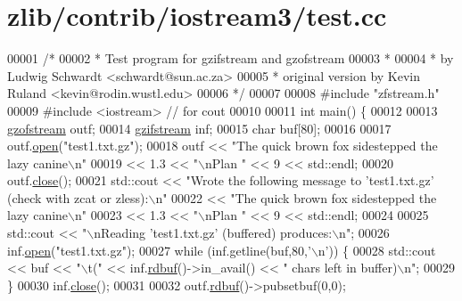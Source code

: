 \hypertarget{zlib_2contrib_2iostream3_2test_8cc_source}{}\section{zlib/contrib/iostream3/test.cc}
\label{zlib_2contrib_2iostream3_2test_8cc_source}

\begin{DoxyCode}
00001 \textcolor{comment}{/*}
00002 \textcolor{comment}{ * Test program for gzifstream and gzofstream}
00003 \textcolor{comment}{ *}
00004 \textcolor{comment}{ * by Ludwig Schwardt <schwardt@sun.ac.za>}
00005 \textcolor{comment}{ * original version by Kevin Ruland <kevin@rodin.wustl.edu>}
00006 \textcolor{comment}{ */}
00007 
00008 \textcolor{preprocessor}{#include "zfstream.h"}
00009 \textcolor{preprocessor}{#include <iostream>}      \textcolor{comment}{// for cout}
00010 
00011 \textcolor{keywordtype}{int} main() \{
00012 
00013   \hyperlink{classgzofstream}{gzofstream} outf;
00014   \hyperlink{classgzifstream}{gzifstream} inf;
00015   \textcolor{keywordtype}{char} buf[80];
00016 
00017   outf.\hyperlink{classgzofstream_aee3eb31f07eda7f5ad1f60d59ea4b239}{open}(\textcolor{stringliteral}{"test1.txt.gz"});
00018   outf << \textcolor{stringliteral}{"The quick brown fox sidestepped the lazy canine\(\backslash\)n"}
00019        << 1.3 << \textcolor{stringliteral}{"\(\backslash\)nPlan "} << 9 << std::endl;
00020   outf.\hyperlink{classgzofstream_a59e8b01e1c9741085f18ca456c4b8f54}{close}();
00021   std::cout << \textcolor{stringliteral}{"Wrote the following message to 'test1.txt.gz' (check with zcat or zless):\(\backslash\)n"}
00022             << \textcolor{stringliteral}{"The quick brown fox sidestepped the lazy canine\(\backslash\)n"}
00023             << 1.3 << \textcolor{stringliteral}{"\(\backslash\)nPlan "} << 9 << std::endl;
00024 
00025   std::cout << \textcolor{stringliteral}{"\(\backslash\)nReading 'test1.txt.gz' (buffered) produces:\(\backslash\)n"};
00026   inf.\hyperlink{classgzifstream_a8105f9300d36dafbe8b10c204583f5a1}{open}(\textcolor{stringliteral}{"test1.txt.gz"});
00027   \textcolor{keywordflow}{while} (inf.getline(buf,80,\textcolor{charliteral}{'\(\backslash\)n'})) \{
00028     std::cout << buf << \textcolor{stringliteral}{"\(\backslash\)t("} << inf.\hyperlink{classgzifstream_a1c5a0ab4f99f8d8e3406af7bfd82b133}{rdbuf}()->in\_avail() << \textcolor{stringliteral}{" chars left in buffer)\(\backslash\)n"};
00029   \}
00030   inf.\hyperlink{classgzifstream_a073fadd9dc90195c47a6ae2d863c8ace}{close}();
00031 
00032   outf.\hyperlink{classgzofstream_a2fef74202b114357f41cfeb28f1d2acc}{rdbuf}()->pubsetbuf(0,0);

\end{DoxyCode}

